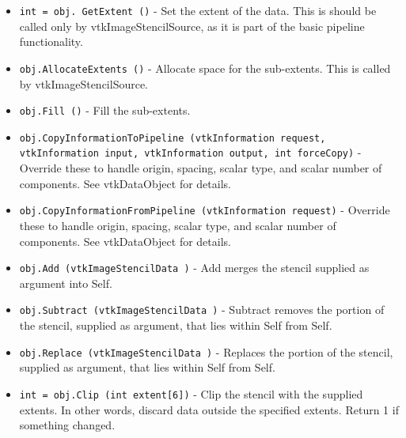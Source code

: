 \begin{itemize}
\item  \verb|int = obj. GetExtent ()| -  Set the extent of the data.  This is should be called only 
 by vtkImageStencilSource, as it is part of the basic pipeline
 functionality.

\item  \verb|obj.AllocateExtents ()| -  Allocate space for the sub-extents.  This is called by
 vtkImageStencilSource.

\item  \verb|obj.Fill ()| -  Fill the sub-extents.

\item  \verb|obj.CopyInformationToPipeline (vtkInformation request, vtkInformation input, vtkInformation output, int forceCopy)| -  Override these to handle origin, spacing, scalar type, and scalar
 number of components.  See vtkDataObject for details.

\item  \verb|obj.CopyInformationFromPipeline (vtkInformation request)| -  Override these to handle origin, spacing, scalar type, and scalar
 number of components.  See vtkDataObject for details.

\item  \verb|obj.Add (vtkImageStencilData )| -  Add merges the stencil supplied as argument into Self.

\item  \verb|obj.Subtract (vtkImageStencilData )| -  Subtract removes the portion of the stencil, supplied as argument, 
 that lies within Self from Self.   

\item  \verb|obj.Replace (vtkImageStencilData )| -  Replaces the portion of the stencil, supplied as argument, 
 that lies within Self from Self.   

\item  \verb|int = obj.Clip (int extent[6])| -  Clip the stencil with the supplied extents. In other words, discard data
 outside the specified extents. Return 1 if something changed.

\end{itemize}
